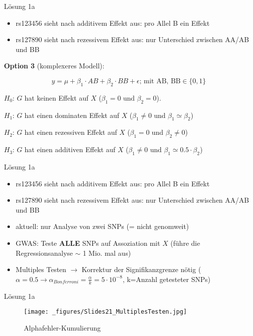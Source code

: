 \documentclass{beamer}
\begin{document}
\begin{frame}{Lösung 1a}
\begin{itemize}
    \item rs123456 sieht nach additivem Effekt aus: pro Allel B ein Effekt
    \item rs127890 sieht nach rezessivem Effekt aus: nur Unterschied zwischen AA/AB und BB
\end{itemize}

\textbf{Option 3} (komplexeres Modell):

$$ y = \mu + \beta_1 \cdot AB + \beta_2 \cdot BB + \epsilon \text{;  mit AB, BB} \in \{0,1\}$$

$H_0$: $G$ hat keinen Effekt auf $X$ ($\beta_1 = 0$ und $\beta_2 = 0$). 

$H_1$: $G$ hat einen dominaten Effekt auf $X$ ($\beta_1 \neq 0$ und $\beta_1 \simeq \beta_2$)

$H_2$: $G$ hat einen rezessiven Effekt auf $X$ ($\beta_1 = 0$ und $\beta_2 \neq 0$)

$H_3$: $G$ hat einen additiven Effekt auf $X$ ($\beta_1 \neq 0$ und $\beta_1 \simeq 0.5 \cdot \beta_2$)

\end{frame}

\begin{frame}{Lösung 1a}
\begin{itemize}
    \item rs123456 sieht nach additivem Effekt aus: pro Allel B ein Effekt
    \item rs127890 sieht nach rezessivem Effekt aus: nur Unterschied zwischen AA/AB und BB
    \item aktuell: nur Analyse von zwei SNPs (= nicht genomweit)
    \item GWAS: Teste \textbf{ALLE} SNPs auf Assoziation mit $X$ (führe die Regressionsanalyse $\sim$ 1 Mio. mal aus)
    \item Multiples Testen $\rightarrow$ Korrektur der Signifikanzgrenze nötig ($\alpha=0.5 \rightarrow \alpha_{Bonferroni} = \frac{\alpha}{k} = 5\cdot 10^{-8}$, k=Anzahl getesteter SNPs)
\end{itemize}
\end{frame}

\begin{frame}{Lösung 1a}
\begin{figure}[h]
\begin{center}
\texttt{[image: \_figures/Slides21\_MultiplesTesten.jpg]}
\caption{Alphafehler-Kumulierung}
\label{fig:MultiplesTesten}
\end{center}
\end{figure}
\end{frame}
\end{document}
